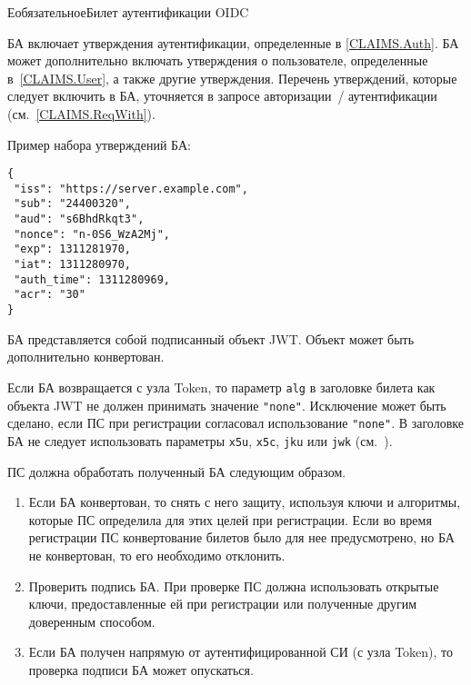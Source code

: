 \begin{appendix}{Е}{обязательное}{Билет аутентификации OIDC}\label{IDTOKEN}

\label{IDTOKEN.Structure}

БА включает утверждения аутентификации, определенные в \ref{CLAIMS.Auth}.
БА может дополнительно включать утверждения о пользователе, 
определенные в~\ref{CLAIMS.User}, а также другие утверждения.
% 
Перечень утверждений, которые следует включить в БА, уточняется в 
запросе авторизации~/ аутентификации (см.~\ref{CLAIMS.ReqWith}).

Пример набора утверждений БА:
\begin{lstlisting}
{
 "iss": "https://server.example.com",
 "sub": "24400320",
 "aud": "s6BhdRkqt3",
 "nonce": "n-0S6_WzA2Mj",
 "exp": 1311281970,
 "iat": 1311280970,
 "auth_time": 1311280969,
 "acr": "30"
}
\end{lstlisting}

БА представляется собой подписанный объект JWT. Объект может быть дополнительно 
конвертован. 

Если БА возвращается с узла Token, то параметр \lstinline{alg} в заголовке 
билета как объекта JWT не должен принимать значение \lstinline{"none"}.
%
Исключение может быть сделано, если ПС при регистрации согласовал использование 
\lstinline{"none"}.
%
В заголовке БА не следует использовать параметры 
\lstinline{x5u}, \lstinline{x5c}, \lstinline{jku} или \lstinline{jwk}
(см.~\cite{RFC7515,RFC7516}).

\label{IDTOKEN.Process}

ПС должна обработать полученный БА следующим образом.

\begin{enumerate}
\item 
Если БА конвертован, то снять с него защиту, используя ключи и алгоритмы, 
которые ПС определила для этих целей при регистрации.
%
Если во время регистрации ПС конвертование билетов было для нее
предусмотрено, но БА не конвертован, то его необходимо отклонить.

\item 
Проверить подпись БА. При проверке ПС должна использовать открытые ключи, 
предоставленные ей при регистрации или полученные другим доверенным способом. 

\item 
Если БА получен напрямую от аутентифицированной СИ (с узла Token), 
то проверка подписи БА может опускаться.


\end{enumerate}
\end{appendix}
